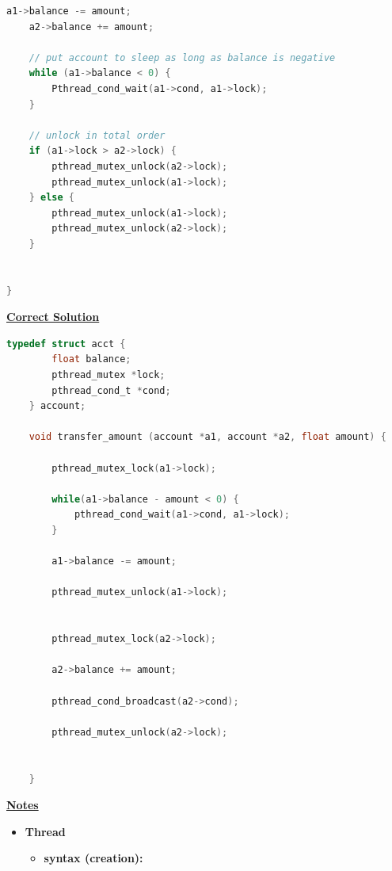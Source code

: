 \documentclass[12pt]{article}
\begin{document}
\begin{enumerate}[1.]
\begin{enumerate}[a)]
\begin{lstlisting}[language=c]
    a1->balance -= amount;
    a2->balance += amount;

    // put account to sleep as long as balance is negative
    while (a1->balance < 0) {
        Pthread_cond_wait(a1->cond, a1->lock);
    }

    // unlock in total order
    if (a1->lock > a2->lock) {
        pthread_mutex_unlock(a2->lock);
        pthread_mutex_unlock(a1->lock);
    } else {
        pthread_mutex_unlock(a1->lock);
        pthread_mutex_unlock(a2->lock);
    }


}
\end{lstlisting}

        \bigskip

        \begin{mdframed}
        \underline{\textbf{Correct Solution}}

\begin{lstlisting}[language=c]
    typedef struct acct {
        float balance;
        pthread_mutex *lock;
        pthread_cond_t *cond;
    } account;

    void transfer_amount (account *a1, account *a2, float amount) {

        pthread_mutex_lock(a1->lock);

        while(a1->balance - amount < 0) {
            pthread_cond_wait(a1->cond, a1->lock);
        }

        a1->balance -= amount;

        pthread_mutex_unlock(a1->lock);


        pthread_mutex_lock(a2->lock);

        a2->balance += amount;

        pthread_cond_broadcast(a2->cond);

        pthread_mutex_unlock(a2->lock);


    }
\end{lstlisting}
        \end{mdframed}

        \bigskip

        \underline{\textbf{Notes}}

        \begin{itemize}

            \item \textbf{Thread}

            \begin{itemize}
                \item \textbf{syntax (creation):}


\end{itemize}
\end{itemize}
\end{enumerate}
\end{enumerate}
\end{document}
